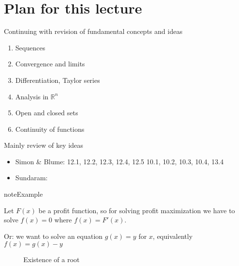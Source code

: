 \documentclass[letterpaper,10pt,english]{jupyterBook}
\begin{document}
\section{Plan for this lecture}
\label{\detokenize{04.basic_analysis:plan-for-this-lecture}}
\sphinxAtStartPar
Continuing with revision of fundamental concepts and ideas
\begin{enumerate}
%
\item {} 
\sphinxAtStartPar
Sequences

\item {} 
\sphinxAtStartPar
Convergence and limits

\item {} 
\sphinxAtStartPar
Differentiation, Taylor series

\item {} 
\sphinxAtStartPar
Analysis in \(\mathbb{R}^n\)

\item {} 
\sphinxAtStartPar
Open and closed sets

\item {} 
\sphinxAtStartPar
Continuity of functions

\end{enumerate}

\sphinxAtStartPar
Mainly review of key ideas

\sphinxAtStartPar
{}
\begin{itemize}
\item {} 
\sphinxAtStartPar
Simon \& Blume: 12.1, 12.2, 12.3, 12.4, 12.5 10.1, 10.2, 10.3, 10.4, 13.4

\item {} 
\sphinxAtStartPar
Sundaram:

\end{itemize}

\begin{sphinxadmonition}{note}{Example}

\sphinxAtStartPar
Let \(F(x)\) be a profit function, so for solving profit maximization we have to solve \(f(x)=0\) where \(f(x)=F'(x)\).

\sphinxAtStartPar
Or: we want to solve an equation \(g(x) = y\) for \(x\), equivalently
\(f(x) = g(x) - y\)
\end{sphinxadmonition}

\begin{figure}[htbp]
\centering
\capstart

\noindent{}
\caption{Existence of a root}\label{\detokenize{04.basic_analysis:root}}\end{figure}
\end{document}

